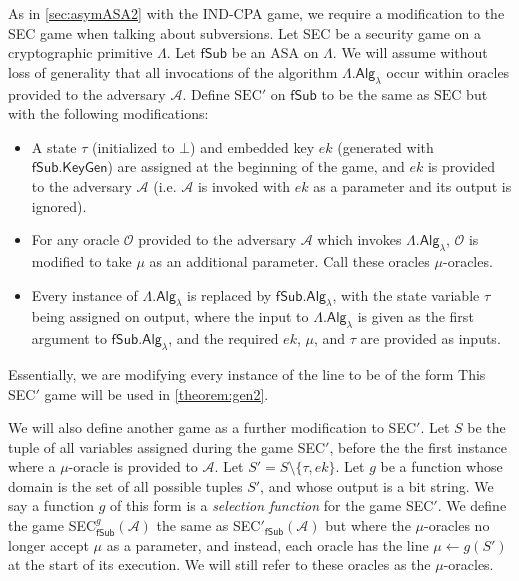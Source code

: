 As in \autoref{sec:asymASA2} with the IND-CPA game, we require a modification to the SEC game when talking about subversions. Let SEC be a security game on a cryptographic primitive $\mathsf{\Lambda}$. Let $\mathsf{fSub}$ be an ASA on $\mathsf{\Lambda}$. We will assume without loss of generality that all invocations of the algorithm $\mathsf{\Lambda.Alg}_\lambda$ occur within oracles provided to the adversary $\mathcal{A}$. Define $\mathrm{SEC'}$ on $\mathsf{fSub}$ to be the same as $\mathrm{SEC}$ but with the following modifications:
\begin{itemize}\itemsep0em
\item A state $\tau$ (initialized to $\bot$) and embedded key $ek$ (generated with $\mathsf{fSub.KeyGen}$) are assigned at the beginning of the game, and $ek$ is provided to the adversary $\mathcal{A}$ (i.e. $\mathcal{A}$ is invoked with $ek$ as a parameter and its output is ignored).
\item For any oracle $\mathcal{O}$ provided to the adversary $\mathcal{A}$ which invokes $\mathsf{\Lambda.Alg}_\lambda$, $\mathcal{O}$ is modified to take $\mu$ as an additional parameter. Call these oracles $\mu$-oracles.
\item Every instance of $\mathsf{\Lambda.Alg}_\lambda$ is replaced by $\mathsf{fSub.Alg}_\lambda$, with the state variable $\tau$ being assigned on output, where the input to $\mathsf{\Lambda.Alg}_\lambda$ is given as the first argument to $\mathsf{fSub.Alg}_\lambda$, and the required $ek$, $\mu$, and $\tau$ are provided as inputs.
\end{itemize}
Essentially, we are modifying every instance of the line 
to be of the form
This SEC$'$ game will be used in \autoref{theorem:gen2}.

We will also define another game as a further modification to SEC$'$. Let $S$ be the tuple of all variables assigned during the game SEC$'$, before the the first instance where a $\mu$-oracle is provided to $\mathcal{A}$. Let $S'=S\setminus \{\tau,ek\}$. Let $g$ be a function whose domain is the set of all possible tuples $S'$, and whose output is a bit string. We say a function $g$ of this form is a \emph{selection function} for the game SEC$'$. We define the game SEC$^g_\mathsf{fSub}(\mathcal{A})$ the same as SEC$'_\mathsf{fSub}(\mathcal{A})$ but where the $\mu$-oracles no longer accept $\mu$ as a parameter, and instead, each oracle has the line $\mu \leftarrow g(S')$ at the start of its execution. We will still refer to these oracles as the $\mu$-oracles.

